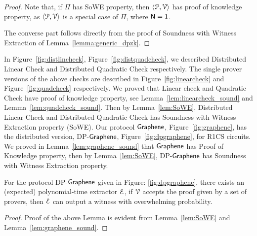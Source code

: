 \begin{proof}
	Note that, if $\Pi$ has SoWE property, then $\langle \mathcal{P},\mathcal{V}\rangle$ has proof of knowledge property, as $\langle \mathcal{P},\mathcal{V}\rangle$ is a special case of $\Pi$, where $\mathsf{N}=1$.
	
	The converse part follows directly from the proof of Soundness with Witness Extraction of Lemma~\ref{lemma:generic_dpzk}.
\end{proof}
In Figure~\ref{fig:distlincheck}, Figure~\ref{fig:distquadcheck}, we described Distributed Linear Check and Distributed Quadratic Check respectively. The single prover versions of the above checks are described in Figure~\ref{fig:linearcheck} and Figure~\ref{fig:quadcheck} respectively. We proved that Linear check and Quadratic Check have proof of knowledge property, see Lemma~\ref{lem:linearcheck_sound} and Lemma~\ref{lem:quadcheck_sound}. Then by Lemma~\ref{lem:SoWE}, Distributed Linear Check and Distributed Quadratic Check has Soundness with Witness Extraction property (SoWE). Our protocol $\textsf{Graphene}$, Figure~\ref{fig:graphene}, has the distributed version, DP-$\textsf{Graphene}$, Figure~\ref{fig:dpgraphene}, for R1CS circuits. We proved in Lemma~\ref{lem:graphene_sound} that $\textsf{Graphene}$ has Proof of Knowledge property, then by Lemma~\ref{lem:SoWE}, DP-$\textsf{Graphene}$ has Soundness with Witness Extraction property. 
\begin{lemma}
	For the protocol DP-$\textsf{Graphene}$ given in Figure: \ref{fig:dpgraphene}, there exists an (expected) polynomial-time extractor $\mathcal{E}$, if $\mathcal{V}$ accepts the proof given by a set of provers, then $\mathcal{E}$ can output a witness with overwhelming probability.
\end{lemma}
\begin{proof}
Proof of the above Lemma is evident from Lemma~\ref{lem:SoWE} and Lemma~\ref{lem:graphene_sound}.
\end{proof}

